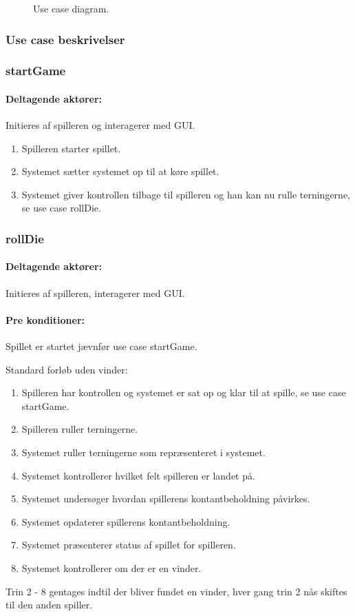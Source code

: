 \begin{figure}
\caption{Use case diagram.}\label{fig:tikzUseCase}
\centering

\end{figure}

\subsubsection{Use case beskrivelser}

\subsubsection{startGame}

\paragraph{Deltagende aktører:} Initieres af spilleren og interagerer med GUI.

\begin{enumerate}
\item Spilleren starter spillet.
\item Systemet sætter systemet op til at køre spillet.
\item Systemet giver kontrollen tilbage til spilleren og han kan nu rulle terningerne, se use case rollDie.
\end{enumerate}

\subsubsection{rollDie}
\paragraph{Deltagende aktører:} Initieres af spilleren, interagerer med GUI.

\paragraph{Pre konditioner:} Spillet er startet jævnfør use case startGame.

Standard forløb uden vinder:
\begin{enumerate}
\item Spilleren har kontrollen og systemet er sat op og klar til at spille, se use case startGame.
\item Spilleren ruller terningerne.
\item Systemet ruller terningerne som repræsenteret i systemet.
\item Systemet kontrollerer hvilket felt spilleren er landet på.
\item Systemet undersøger hvordan spillerens kontantbeholdning påvirkes.
\item Systemet opdaterer spillerens kontantbeholdning.
\item Systemet præsenterer status af spillet for spilleren.
\item Systemet kontrollerer om der er en vinder.
\end{enumerate}
Trin 2 - 8 gentages indtil der bliver fundet en vinder, hver gang trin 2 nås skiftes til den anden spiller.

